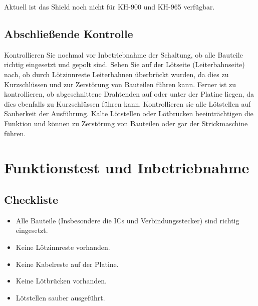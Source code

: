 \documentclass[fleqn,10pt]{SelfArx} %
\begin{document}
Aktuell ist das Shield noch nicht für KH-900 und KH-965 verfügbar.



\subsection*{Abschließende Kontrolle}

Kontrollieren Sie nochmal vor Inbetriebnahme der Schaltung, ob alle Bauteile richtig eingesetzt und gepolt sind. Sehen Sie auf der Lötseite (Leiterbahnseite) nach, ob durch Lötzinnreste Leiterbahnen überbrückt wurden, da dies zu Kurzschlüssen und zur Zerstörung von Bauteilen führen kann. Ferner ist zu kontrollieren, ob abgeschnittene Drahtenden auf oder unter der Platine liegen, da dies ebenfalls zu Kurzschlüssen führen kann.
Kontrollieren sie alle Lötstellen auf Sauberkeit der Ausführung. Kalte Lötstellen oder Lötbrücken beeinträchtigen die Funktion und können zu Zerstörung von Bauteilen oder gar der Strickmaschine führen.


\section{Funktionstest und Inbetriebnahme}

\subsection*{Checkliste}

\begin{itemize}[noitemsep] %
\item[\CheckedBox] Alle Bauteile (Insbesondere die ICs und Verbindungsstecker) sind richtig eingesetzt.
\item[\CheckedBox] Keine Lötzinnreste vorhanden.
\item[\CheckedBox] Keine Kabelreste auf der Platine.
\item[\CheckedBox] Keine Lötbrücken vorhanden.
\item[\CheckedBox] Lötstellen sauber ausgeführt.
\end{itemize}
\end{document}
